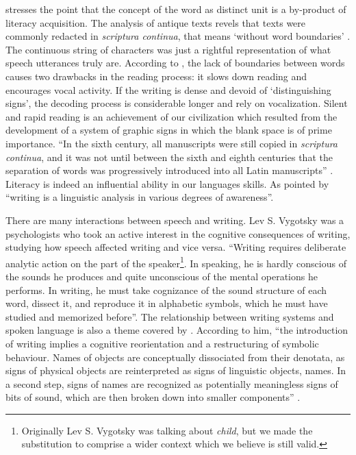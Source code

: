 \cite{olson1994} stresses the point
that the concept of the word as distinct unit is a by-product of literacy acquisition.
The analysis of antique texts revels that texts were commonly redacted in \textit{scriptura continua},
that means `without word boundaries' \citep{saenger}. The continuous string of characters 
was just a rightful representation of what speech utterances truly are.
According to \citep{saenger1997}, the lack of boundaries between words causes 
two drawbacks in the reading process: it slows down reading and encourages vocal activity.
If the writing is dense and devoid of `distinguishing signs', the decoding process
is considerable longer and rely on vocalization. Silent and rapid reading is an achievement 
of our civilization which resulted from the development of a system of graphic signs in which
the blank space is of prime importance. ``In the sixth century, all manuscripts were still copied
in \textit{scriptura continua}, and it was not until between the sixth and eighth centuries that the
separation of words was progressively introduced into all Latin manuscripts'' \citep{pombo2002}. 
Literacy is indeed an influential ability in our languages skills. As pointed by \cite{hagege1986}
``writing is a linguistic analysis in various degrees of awareness''.

There are many interactions between speech and writing. Lev S. Vygotsky was a
psychologists who took an active interest in the cognitive consequences of writing,
studying how speech affected writing and vice versa. 
``Writing requires deliberate analytic action on the part of the speaker\footnote{Originally Lev S. Vygotsky was talking about \textit{child}, but we made the substitution to comprise a wider context which
we believe is still valid.}.
In speaking, he is hardly conscious of the sounds he produces and quite unconscious of
the mental operations he performs. In writing, he must take cognizance of the
sound structure of each word, dissect it, and reproduce it in alphabetic symbols,
which he must have studied and memorized before''\citep{vygotsky}.
The relationship between writing systems and spoken language is also a theme covered
by \cite{coulmas}. According to him, ``the introduction of writing implies a 
cognitive reorientation and a restructuring of symbolic behaviour. Names of objects
are conceptually dissociated from their denotata, as signs of physical objects are
reinterpreted as signs of linguistic objects, names. In a second step, signs of names
are recognized as potentially meaningless signs of bits of sound, which are then
broken down into smaller components'' \citep{coulmas}.

